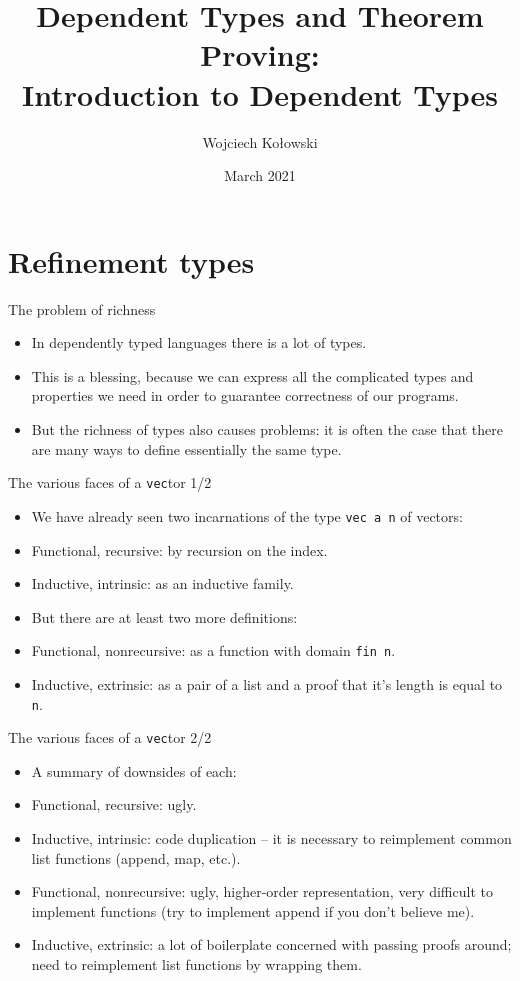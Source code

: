 \documentclass{beamer}
\title{Dependent Types and Theorem Proving: \\Introduction to Dependent Types}
\author{Wojciech Kołowski}
\date{March 2021}
\newcommand{\m}[1]{\texttt{#1}}
\begin{document}
\frame{\titlepage}
\frame{\tableofcontents}

\section{Refinement types}

\begin{frame}{The problem of richness}
\begin{itemize}
    \item In dependently typed languages there is a lot of types.
    \item This is a blessing, because we can express all the complicated types and properties we need in order to guarantee correctness of our programs.
    \item But the richness of types also causes problems: it is often the case that there are many ways to define essentially the same type.
\end{itemize}
\end{frame}

\begin{frame}{The various faces of a \m{vec}tor 1/2}
\begin{itemize}
    \item We have already seen two incarnations of the type \m{vec a n} of vectors:
    \item Functional, recursive: by recursion on the index.
    \item Inductive, intrinsic: as an inductive family.
    \item But there are at least two more definitions:
    \item Functional, nonrecursive: as a function with domain \m{fin n}.
    \item Inductive, extrinsic: as a pair of a list and a proof that it's length is equal to \m{n}.
\end{itemize}
\end{frame}

\begin{frame}{The various faces of a \m{vec}tor 2/2}
\begin{itemize}
    \item A summary of downsides of each:
    \item Functional, recursive: ugly.
    \item Inductive, intrinsic: code duplication – it is necessary to reimplement common list functions (append, map, etc.).
    \item Functional, nonrecursive: ugly, higher-order representation, very difficult to implement functions (try to implement append if you don’t believe me).
    \item Inductive, extrinsic: a lot of boilerplate concerned with passing proofs around; need to reimplement list functions by wrapping them.
\end{itemize}
\end{frame}
\end{document}
